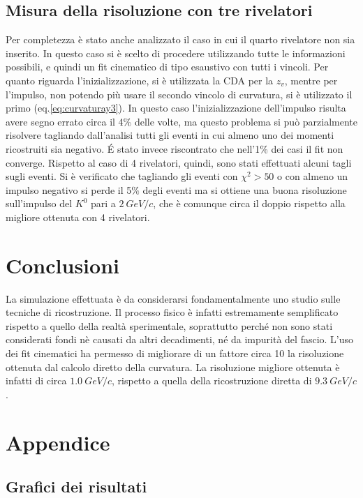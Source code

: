 \documentclass[8pt]{extarticle}
\begin{document}
\subsection{Misura della risoluzione con tre rivelatori}
Per completezza è stato anche analizzato il caso in cui il quarto rivelatore non sia inserito. In questo caso si è scelto di procedere utilizzando tutte le informazioni possibili, e quindi un fit cinematico di tipo esaustivo con tutti i vincoli. Per quanto riguarda l'inizializzazione, si è utilizzata la CDA per la $z_v$, mentre per l'impulso, non potendo più usare il secondo vincolo di curvatura, si è utilizzato il primo (eq.\ref{eq:curvaturay3}). In questo caso l'inizializzazione dell'impulso risulta avere segno errato circa il 4\% delle volte, ma questo problema si può parzialmente risolvere tagliando dall'analisi tutti gli eventi in cui almeno uno dei momenti ricostruiti sia negativo. \'E stato invece riscontrato che nell'1\% dei casi il fit non converge. Rispetto al caso di 4 rivelatori, quindi, sono stati effettuati alcuni tagli sugli eventi. Si è verificato che tagliando gli eventi con $\chi^2 > 50$ o con almeno un impulso negativo si perde il 5$\%$ degli eventi ma si ottiene una buona risoluzione sull'impulso del $K^0$ pari a $2\ GeV/c$, che è comunque circa il doppio rispetto alla migliore ottenuta con 4 rivelatori.


\section{Conclusioni} \label{sec:conclusioni}
La simulazione effettuata è da considerarsi fondamentalmente uno studio sulle tecniche di ricostruzione. Il processo fisico è infatti estremamente semplificato rispetto a quello della realtà sperimentale, soprattutto perché non sono stati considerati fondi nè causati da altri decadimenti, né da impurità del fascio. L'uso dei fit cinematici ha permesso di migliorare di un fattore circa 10 la risoluzione ottenuta dal calcolo diretto della curvatura. La risoluzione migliore ottenuta è infatti di circa $1.0\ GeV/c$, rispetto a quella della ricostruzione diretta di $9.3\ GeV/c$. 

\newpage

\section{Appendice}
\subsection{Grafici dei risultati} \label{subsec:grafici}
\end{document}
